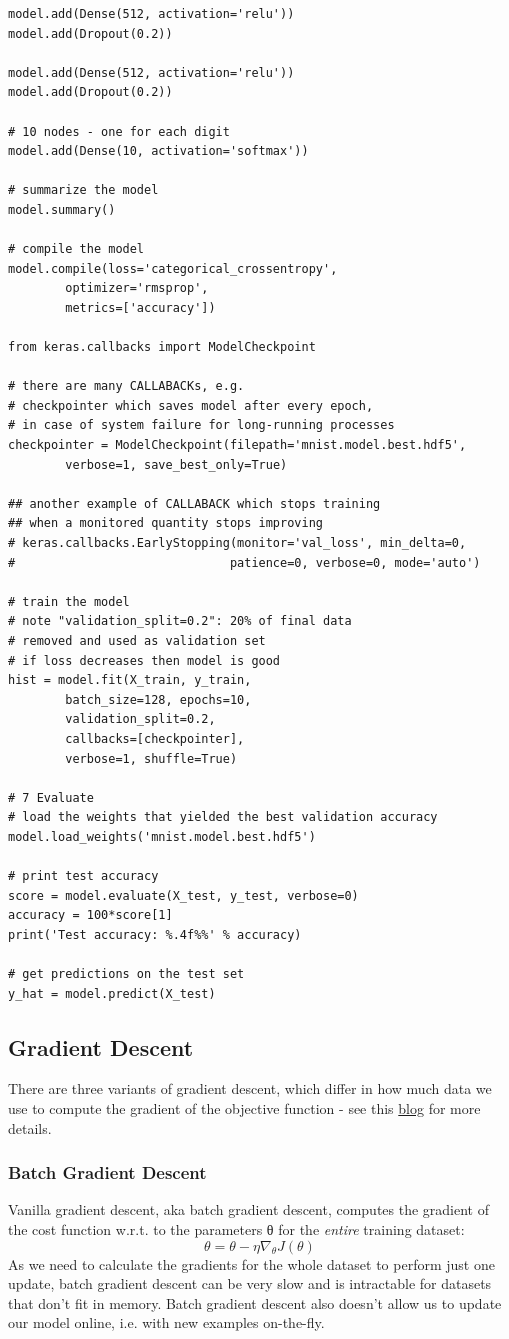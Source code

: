 \documentclass[11pt]{article}
\begin{document}
\begin{lstlisting}
model.add(Dense(512, activation='relu'))
model.add(Dropout(0.2))

model.add(Dense(512, activation='relu'))
model.add(Dropout(0.2))

# 10 nodes - one for each digit
model.add(Dense(10, activation='softmax'))

# summarize the model
model.summary()

# compile the model
model.compile(loss='categorical_crossentropy', 
		optimizer='rmsprop', 
		metrics=['accuracy'])

from keras.callbacks import ModelCheckpoint   

# there are many CALLABACKs, e.g. 
# checkpointer which saves model after every epoch,
# in case of system failure for long-running processes
checkpointer = ModelCheckpoint(filepath='mnist.model.best.hdf5', 
		verbose=1, save_best_only=True)

## another example of CALLABACK which stops training 
## when a monitored quantity stops improving
# keras.callbacks.EarlyStopping(monitor='val_loss', min_delta=0,
#                              patience=0, verbose=0, mode='auto')

# train the model
# note "validation_split=0.2": 20% of final data 
# removed and used as validation set
# if loss decreases then model is good
hist = model.fit(X_train, y_train, 
		batch_size=128, epochs=10,
		validation_split=0.2, 
		callbacks=[checkpointer],
		verbose=1, shuffle=True)

# 7 Evaluate
# load the weights that yielded the best validation accuracy
model.load_weights('mnist.model.best.hdf5')

# print test accuracy
score = model.evaluate(X_test, y_test, verbose=0)
accuracy = 100*score[1]
print('Test accuracy: %.4f%%' % accuracy)

# get predictions on the test set
y_hat = model.predict(X_test)
\end{lstlisting}

\subsection{Gradient Descent} \label{gradient_descent}
There are three variants of gradient descent, which differ in how much data we use to compute the gradient of the objective function - see this \href{http://ruder.io/optimizing-gradient-descent/}{blog} for more details. 

\subsubsection*{Batch Gradient Descent}
Vanilla gradient descent, aka batch gradient descent, computes the gradient of the cost function w.r.t. to the parameters θ for the \textit{entire} training dataset:
\[ \theta = \theta - \eta \nabla_{\theta} J(\theta)
\]
As we need to calculate the gradients for the whole dataset to perform just one update, batch gradient descent can be very slow and is intractable for datasets that don't fit in memory. Batch gradient descent also doesn't allow us to update our model online, i.e. with new examples on-the-fly.
\end{document}
